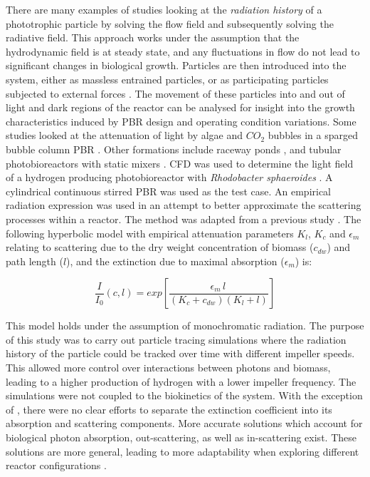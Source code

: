 There are many examples of studies looking at the \textit{radiation history} of a phototrophic particle by solving the flow field and subsequently solving the radiative field. This approach works under the assumption that the hydrodynamic field is at steady state, and any fluctuations in flow do not lead to significant changes in biological growth. Particles are then introduced into the system, either as massless entrained particles, or as participating particles subjected to external forces \cite{zhang2013}. The movement of these particles into and out of light and dark regions of the reactor can be analysed for insight into the growth characteristics induced by PBR design and operating condition variations. Some studies looked at the attenuation of light by algae and $CO_2$ bubbles in a sparged bubble column PBR \cite{hochhalter2014}. Other formations include raceway ponds \cite{gharagozloo2014,Park2015}, and tubular photobioreactors with static mixers \cite{cheng2016}. CFD was used to determine the light field of a hydrogen producing photobioreactor with \textit{Rhodobacter sphaeroides} \cite{krujatz2015}. A cylindrical continuous stirred PBR was used as the test case. An empirical radiation expression was used in an attempt to better approximate the scattering processes within a reactor. The method was adapted from a previous study \cite{suh2003}. The following hyperbolic model with empirical attenuation parameters $K_l$, $K_c$ and $\epsilon_m$ relating to scattering due to the dry weight concentration of biomass ($c_{dw}$) and path length ($l$), and the extinction due to maximal absorption ($\epsilon_m$) is:


\begin{equation} 
\frac{I}{I_0} (c,l) = exp \left[\frac{\epsilon_m \, l \, }{(K_c + c_{dw})(K_l + l)}\right]
\end{equation}

This model holds under the assumption of monochromatic radiation. The purpose of this study was to carry out particle tracing simulations where the radiation history of the particle could be tracked over time with different impeller speeds. This allowed more control over interactions between photons and biomass, leading to a higher production of hydrogen with a lower impeller frequency. The simulations were not coupled to the biokinetics of the system. With the exception of \cite{gharagozloo2014,krujatz2015}, there were no clear efforts to separate the extinction coefficient into its absorption and scattering components. More accurate solutions which account for biological photon absorption, out-scattering, as well as in-scattering exist. These solutions are more general, leading to more adaptability when exploring different reactor configurations \cite{ho2009}.


